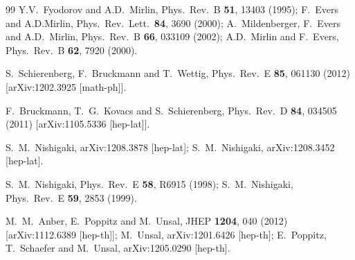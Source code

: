 \documentclass[twocolumn, prd, preprintnumbers, amsmath,
  amssymb, showpacs, floatfix]{revtex4-1}
\begin{document}
\begin{thebibliography}{99}
  Y.V.~Fyodorov and A.D.~Mirlin, 
  Phys.\ Rev.\ B {\bf 51}, 13403 (1995);
 F.~Evers and A.D.Mirlin,
 Phys.\ Rev.\ Lett.\ {\bf 84}, 3690 (2000);
 A.~Mildenberger, F.~Evers and A.D.~Mirlin,
 Phys.\ Rev.\ B {\bf 66}, 033109 (2002);
A.D.~Mirlin and F.~Evers,
Phys.\ Rev.\ B {\bf 62}, 7920 (2000).

  S.~Schierenberg, F.~Bruckmann and T.~Wettig,
  Phys.\ Rev.\ E {\bf 85}, 061130 (2012)
  [arXiv:1202.3925 [math-ph]].


  F.~Bruckmann, T.~G.~Kovacs and S.~Schierenberg,
  Phys.\ Rev.\ D {\bf 84}, 034505 (2011)
  [arXiv:1105.5336 [hep-lat]].

  S.~M.~Nishigaki,
  arXiv:1208.3878 [hep-lat];
  S.~M.~Nishigaki,
  arXiv:1208.3452 [hep-lat].

  S.~M.~Nishigaki,
  Phys.\ Rev.\  E {\bf 58}, R6915 (1998); 
  S.~M.~Nishigaki, 
  Phys.\ Rev.\  E {\bf 59}, 2853 (1999). 

  M.~M.~Anber, E.~Poppitz and M.~Unsal,
  JHEP {\bf 1204}, 040 (2012)
  [arXiv:1112.6389 [hep-th]];
  M.~Unsal,
  arXiv:1201.6426 [hep-th];
  E.~Poppitz, T.~Schaefer and M.~Unsal,
  arXiv:1205.0290 [hep-th].





\end{thebibliography}
\end{document}
